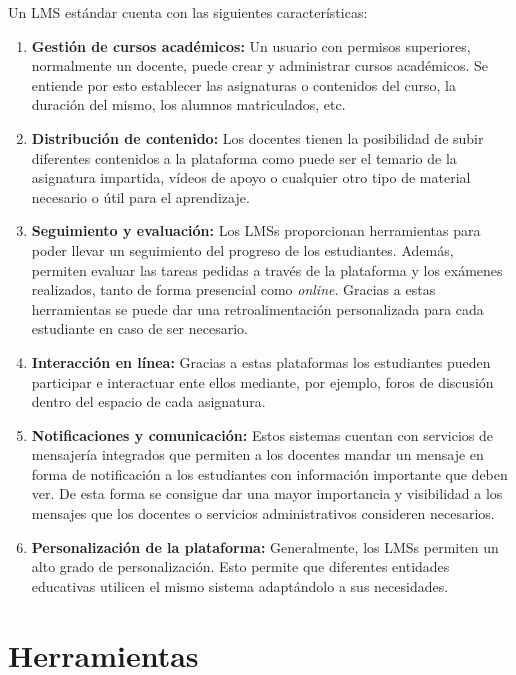 Un LMS estándar cuenta con las siguientes características:
\begin{enumerate}
\item \textbf{Gestión de cursos académicos:} Un usuario con permisos superiores, normalmente un docente, puede crear y administrar cursos académicos.
Se entiende por esto establecer las asignaturas o contenidos del curso, la duración del mismo, los alumnos matriculados, etc.

\item \textbf{Distribución de contenido:} Los docentes tienen la posibilidad de subir diferentes contenidos a la plataforma como puede ser el temario de la asignatura impartida, vídeos de apoyo o cualquier otro tipo de material necesario o útil para el aprendizaje.

\item \textbf{Seguimiento y evaluación:} Los LMSs proporcionan herramientas para poder llevar un seguimiento del progreso de los estudiantes. 
Además, permiten evaluar las tareas pedidas a través de la plataforma y los exámenes realizados, tanto de forma presencial como \textit{online}.
Gracias a estas herramientas se puede dar una retroalimentación personalizada para cada estudiante en caso de ser necesario.

\item \textbf{Interacción en línea:} Gracias a estas plataformas los estudiantes pueden participar e interactuar ente ellos mediante, por ejemplo, foros de discusión dentro del espacio de cada asignatura.

\item \textbf{Notificaciones y comunicación:} Estos sistemas cuentan con servicios de mensajería integrados que permiten a los docentes mandar un mensaje en forma de notificación a los estudiantes con información importante que deben ver.
De esta forma se consigue dar una mayor importancia y visibilidad a los mensajes que los docentes o servicios administrativos consideren necesarios.

\item \textbf{Personalización de la plataforma:} Generalmente, los LMSs permiten un alto grado de personalización. Esto permite que diferentes entidades educativas utilicen el mismo sistema adaptándolo a sus necesidades.

\end{enumerate}
 
\section{Herramientas}
